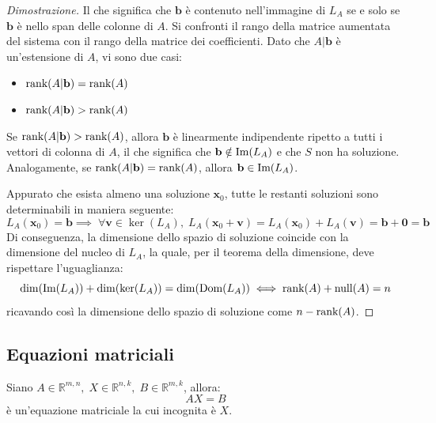 \documentclass{article}
\begin{document}
\begin{proof}[Dimostrazione]
        \vspace{10pt}
        Il che significa che $\mathbf{b}$ è contenuto nell'immagine di $L_A$ se e solo se $\mathbf{b}$ è nello span delle colonne di $A$.
        Si confronti il rango della matrice aumentata del sistema con il rango della matrice dei coefficienti. Dato che $A | \mathbf{b}$ è un'estensione di $A$, vi sono due casi: 
        \begin{itemize}
            \item $\textnormal{rank}{(A | \mathbf{b})} = \textnormal{rank}(A)$ 
            \item $\textnormal{rank}{(A | \mathbf{b})} > \textnormal{rank}(A)$ 
        \end{itemize}
        Se $\textnormal{rank}{(A | \mathbf{b})} > \textnormal{rank}(A)$, allora $\mathbf{b}$ è linearmente indipendente ripetto a tutti i vettori di colonna di $A$, il che significa
        che $\mathbf{b} \notin \textnormal{Im}(L_A)$ e che $S$ non ha soluzione. Analogamente, se $\textnormal{rank}{(A | \mathbf{b})} = \textnormal{rank}(A)$, allora $\mathbf{b} \in \textnormal{Im}(L_A)$.

        \vspace{10pt}
        Appurato che esista almeno una soluzione $\mathbf{x}_{0}$, tutte le restanti soluzioni sono determinabili in maniera seguente:
        \[
            L_A(\mathbf{x}_{0}) = \mathbf{b} \implies \; \forall \mathbf{v} \in \ker(L_A), \; L_A(\mathbf{x}_{0} + \mathbf{v}) = L_A(\mathbf{x}_{0}) + L_A(\mathbf{v}) = \mathbf{b} + \mathbf{0} = \mathbf{b}
        \]
        Di conseguenza, la dimensione dello spazio di soluzione coincide con la dimensione del nucleo di $L_A$, la quale, per il teorema della dimensione, deve rispettare l'uguaglianza:
        \[
            \dim(\textnormal{Im}(L_A)) + \dim(\ker(L_A)) = \dim(\textnormal{Dom}(L_A)) \iff \textnormal{rank}(A) + \textnormal{null}(A) = n
        \] 
        ricavando così la dimensione dello spazio di soluzione come $n - \textnormal{rank}(A)$.  
    \end{proof}




\subsection{Equazioni matriciali} \label{subsec:matequation}
    Siano $A \in \mathbb{R}^{m, n}, \; X \in \mathbb{R}^{n, k}, \; B \in \mathbb{R}^{m, k}$, allora:
    \[
        AX = B
    \]
    è un'equazione matriciale la cui incognita è $X$.
\end{document}
